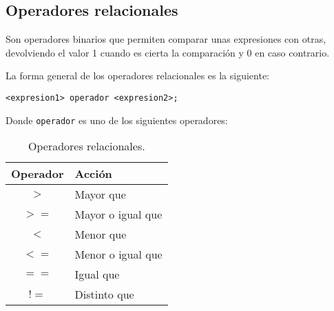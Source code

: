 \subsection{Operadores relacionales}{
Son operadores binarios que permiten comparar unas expresiones con otras, devolviendo el valor 1 cuando es cierta la comparación y 0 en caso contrario.

La forma general de los operadores relacionales es la siguiente:

\texttt{<expresion1>\ operador <expresion2>;}

Donde \texttt{operador} es uno de los siguientes operadores:
\begin{table}[htbp]
	\begin{center}
		\begin{tabular}{|c|l|}
			\hline
			\textbf{Operador} & \textbf{Acción}  \\
			\hline 
			$>$  & Mayor que\\ \hline
			$>=$  & Mayor o igual que\\ \hline
			$<$  & Menor que\\ \hline
			$<=$  & Menor o igual que\\ \hline
			$==$  & Igual que\\ \hline
			$!=$  & Distinto que\\ \hline	
		\end{tabular}
		\caption{Operadores relacionales.}
		\label{tabla:Operadores relacionales}
	\end{center}
\end{table}
}

